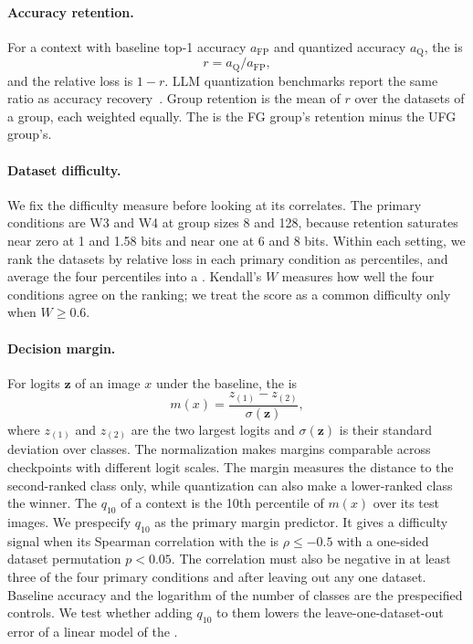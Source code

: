\paragraph{Accuracy retention.}
For a context with baseline top-1 accuracy $a_{\mathrm{FP}}$ and quantized accuracy $a_{\mathrm{Q}}$, the  is
\begin{equation}
  r = a_{\mathrm{Q}} / a_{\mathrm{FP}},
  \label{eq:retention}
\end{equation}
and the relative loss is $1-r$.
LLM quantization benchmarks report the same ratio as accuracy recovery~\cite{kurtic2025bf16}.
Group retention is the mean of $r$ over the datasets of a group, each weighted equally.
The  is the FG group's retention minus the UFG group's.

\paragraph{Dataset difficulty.}
We fix the difficulty measure before looking at its correlates.
The primary conditions are W3 and W4 at group sizes 8 and 128, because retention saturates near zero at 1 and 1.58 bits and near one at 6 and 8 bits.
Within each setting, we rank the datasets by relative loss in each primary condition as percentiles, and average the four percentiles into a .
Kendall's $W$ measures how well the four conditions agree on the ranking; we treat the score as a common difficulty only when $W \ge 0.6$.

\paragraph{Decision margin.}
For logits $\bm{z}$ of an image $x$ under the baseline, the  is
\begin{equation}
  m(x) = \frac{z_{(1)} - z_{(2)}}{\sigma(\bm{z})},
  \label{eq:margin}
\end{equation}
where $z_{(1)}$ and $z_{(2)}$ are the two largest logits and $\sigma(\bm{z})$ is their standard deviation over classes.
The normalization makes margins comparable across checkpoints with different logit scales.
The margin measures the distance to the second-ranked class only, while quantization can also make a lower-ranked class the winner.
The  $q_{10}$ of a context is the 10th percentile of $m(x)$ over its test images.
We prespecify $q_{10}$ as the primary margin predictor.
It gives a difficulty signal when its Spearman correlation with the  is $\rho \le -0.5$ with a one-sided dataset permutation $p < 0.05$.
The correlation must also be negative in at least three of the four primary conditions and after leaving out any one dataset.
Baseline accuracy and the logarithm of the number of classes are the prespecified controls.
We test whether adding $q_{10}$ to them lowers the leave-one-dataset-out error of a linear model of the .

